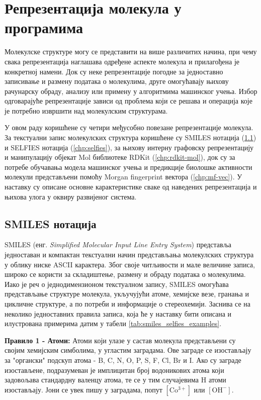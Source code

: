 \documentclass[12pt,oneside]{memoir}
\begin{document}
\chapter{Репрезентација молекула у програмима}
\label{chp:2}
Молекулске структуре могу се представити на више различитих начина, при чему свака 
репрезентација наглашава одређене аспекте молекула и прилагођена је конкретној намени. 
Док су неке репрезентације погодне за једноставно записивање и размену података о 
молекулима, друге омогућавају њихову рачунарску обраду, анализу или примену у 
алгоритмима машинског учења. Избор одговарајуће репрезентације зависи од проблема 
који се решава и операција које је потребно извршити над молекулским структурама.

У овом раду коришћене су четири међусобно повезане репрезентације молекула. За 
текстуални запис молекулских структура коришћене су SMILES нотација (\ref{chp:smiles}) 
и SELFIES нотација (\ref{chp:selfies}), за њихову интерну графовску репрезентацију и 
манипулацију објекат Mol библиотеке RDKit (\ref{chp:rdkit-mol}), 
док су за потребе обучавања модела машинског учења и предикције биолошке активности 
молекули представљени помоћу Morgan fingerprint вектора (\ref{chp:mf-vec}). 
У наставку су описане основне карактеристике сваке од наведених репрезентација и 
њихова улога у оквиру развијеног система.


\section{SMILES нотација}
\label{chp:smiles}

SMILES (енг. \textit{Simplified Molecular Input Line Entry System}) \cite{Weininger1988} представља једноставан и компактан текстуални начин представљања молекулских структура у облику ниске ASCII карактера. Због своје читљивости и мале величине записа, широко се користи за складиштење, размену и обраду података о молекулима. Иако је реч о једнодимензионом текстуалном запису, SMILES омогућава представљање структуре молекула, укључујући атоме, хемијске везе, гранања и цикличне структуре, а по потреби и информације о стереохемији. Заснива се на неколико једноставних правила записа, која ће у наставку бити описана и илустрована примерима датим у табели \ref{tab:smiles_selfies_examples}.

\textbf{Правило 1 - Атоми:} Атоми који улазе у састав молекула представљени су својим хемијским симболима, у угластим заградама. Ове заграде се изостављају за "органски" подскуп атома - B, C, N, O, P, S, F, Cl, Br и I. Ако су заграде изостављене, подразумеван је имплицитан број водоникових атома који задовољава стандардну валенцу атома, те се у тим случајевима H атоми изостављају. Јони се увек пишу у заградама, попут $\mathrm{[Co^{3+}]}$ или $\mathrm{[OH^{-}]}$. 
\end{document}
